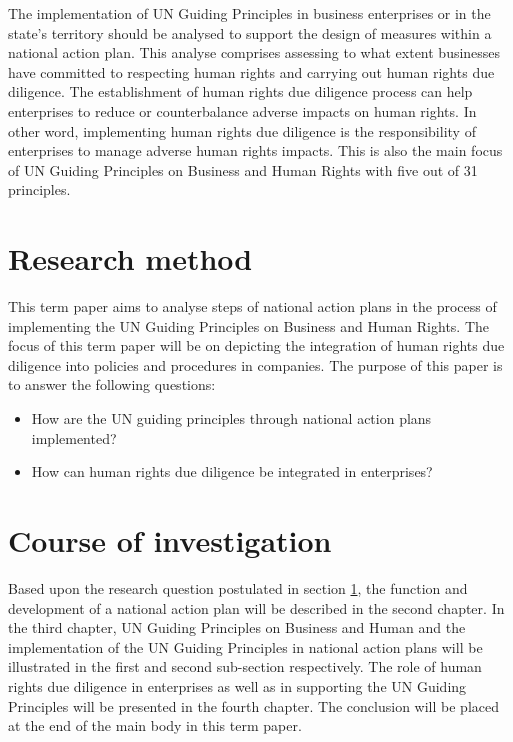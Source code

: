 \documentclass[draft=false
              ,paper=a4
              ,twoside=false
              ,fontsize=12pt
              ,headsepline
              ,BCOR10mm
              ,DIV11
              ]{scrbook}
\begin{document}
The implementation of UN Guiding Principles in business enterprises or in the state’s territory should be analysed to support the design of measures within a national action plan. This analyse comprises assessing to what extent businesses have committed to respecting human rights and carrying out human rights due diligence. The establishment of human rights due diligence process can help enterprises to reduce or counterbalance adverse impacts on human rights. In other word, implementing human rights due diligence is the responsibility of enterprises to manage adverse human rights impacts. This is also the main focus of UN Guiding Principles on Business and Human Rights with five out of 31 principles.

\vspace{12pt}
\section{Research method}\label{research_method}
\vspace{6pt}
This term paper aims to analyse steps of national action plans in the process of implementing the UN Guiding Principles on Business and Human Rights. The focus of this term paper will be on depicting the integration of human rights due diligence into policies and procedures in companies. The purpose  of this paper is to answer the following questions:

\begin{itemize}
\item{How are the UN guiding principles through national action plans implemented?}
\item{How can human rights due diligence be integrated in enterprises?}
\end{itemize}

\vspace{12pt}
\section{Course of investigation}
\vspace{6pt}
Based upon the research question postulated in section \ref{research_method}, the function and development of a national action plan will be described in the second chapter. In the third chapter, UN Guiding Principles on Business and Human and the implementation of the UN Guiding Principles in national action plans will be illustrated in the first and second sub-section respectively. The role of human rights due diligence in enterprises as well as in supporting the UN Guiding Principles will be presented in the fourth chapter. The conclusion will be placed at the end of the main body in this term paper.
\end{document}
